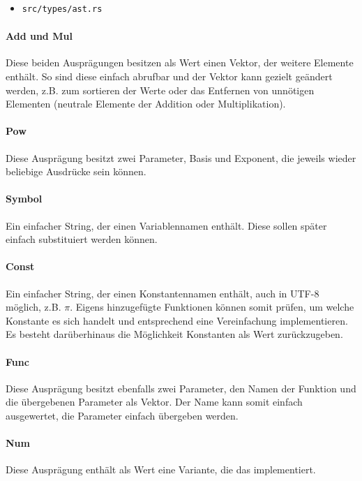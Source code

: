 \documentclass[11pt,a4paper, ngerman]{article}
\begin{document}
\begin{itemize}
    \item \begin{verbatim}src/types/ast.rs\end{verbatim}
\end{itemize}

\paragraph{Add und Mul} Diese beiden Ausprägungen besitzen als Wert einen Vektor, der weitere Elemente enthält. So sind diese einfach abrufbar und der Vektor kann gezielt geändert werden, z.B. zum sortieren der Werte oder das Entfernen von unnötigen Elementen (neutrale Elemente der Addition oder Multiplikation).

\paragraph{Pow} Diese Ausprägung besitzt zwei Parameter, Basis und Exponent, die jeweils wieder beliebige Ausdrücke sein können.

\paragraph{Symbol} Ein einfacher String, der einen Variablennamen enthält. Diese sollen später einfach substituiert werden können.

\paragraph{Const} Ein einfacher String, der einen Konstantennamen enthält, auch in UTF-8 möglich, z.B. $\pi$. Eigens hinzugefügte Funktionen können somit prüfen, um welche Konstante es sich handelt und entsprechend eine Vereinfachung implementieren. Es besteht darüberhinaus die Möglichkeit Konstanten als Wert zurückzugeben.

\paragraph{Func} Diese Ausprägung besitzt ebenfalls zwei Parameter, den Namen der Funktion und die übergebenen Parameter als Vektor. Der Name kann somit einfach ausgewertet, die Parameter einfach übergeben werden.

\paragraph{Num} Diese Ausprägung enthält als Wert eine Variante, die das   implementiert.
\end{document}
